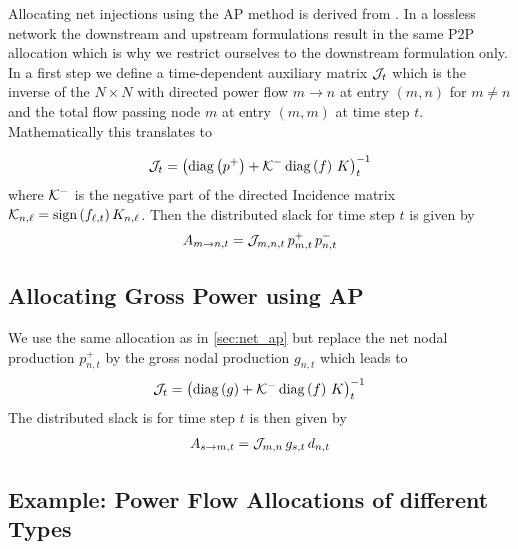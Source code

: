 \documentclass[11pt,twocolumn]{article}
\newcommand{\generation}{g_{s,t}}
\newcommand{\nodalgeneration}[1][n]{g_{#1,t}}
\newcommand{\demand}[1][n]{d_{#1,t}}
\newcommand{\incidence}[1][n]{K_{#1,\ell}}
\newcommand{\flow}{f_{\ell,t}}
\newcommand{\netconsumption}[1][n]{p^{-}_{#1,t}}
\newcommand{\netproduction}[1][n]{p^{+}_{#1,t}}
\newcommand{\allocatePeer}[1][s \rightarrow n]{A_{#1,t}}
\begin{document}
Allocating net injections using the AP method is derived from \cite{achayuthakan_electricity_2010-1}. In a lossless network the downstream and upstream formulations result in the same P2P allocation which is why we restrict ourselves to the downstream formulation only. In a first step we define a time-dependent auxiliary matrix $\mathcal{J}_t$ which is the inverse of the $N\times N$ with directed power flow $m \rightarrow n$ at entry $(m, n)$ for $m \ne n$ and the total flow passing node $m$ at entry $\left( m, m\right)$ at time step $t$. Mathematically this translates to


\begin{align}
\mathcal{J}_t = \left( \operatorname{diag}\left(p^+\right) + \mathcal{K}^- \operatorname{diag}\left(f\right) \, K \right)_t^{-1} 
\end{align}
where $\mathcal{K}^-$ is the negative part of the directed Incidence matrix $\DirectedIncidence_{n,\ell} = \text{sign}\left( \flow \right)  \incidence$. Then the distributed slack for time step $t$ is given by
\begin{align}
\allocatePeer[m \rightarrow n] = \InverseAPInjection_{m,n,t} \, \netproduction[m] \, \netconsumption
\end{align}

\subsection{Allocating Gross Power using AP}
\label{sec:gross_ap}

We use the same allocation as in \cref{sec:net_ap} but replace the net nodal production $\netproduction$ by the gross nodal production $\nodalgeneration$ which leads to  
\begin{align}
\mathcal{J}_t = \left( \operatorname{diag}\left(g\right) + \mathcal{K}^- \operatorname{diag}\left(f\right) \, K \right)_t^{-1} 
\end{align}
The distributed slack is for time step $t$ is then given by
\begin{align}
\allocatePeer[s \rightarrow m] = \InverseAPInjection_{m,n} \, \generation \, \demand
\end{align}


\subsection{Example: Power Flow Allocations of different Types}
\label{sec:example_plots}
\end{document}
